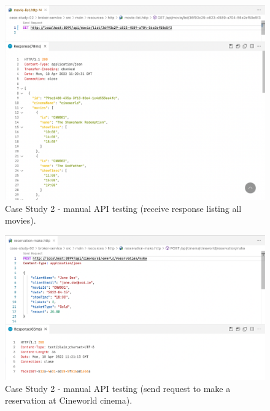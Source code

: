 \begin{figure}[H]
  \centering
  \includegraphics[width=1.0\linewidth]{./assets/images/case-studies/cs02-manual-2.png}
  \caption{Case Study 2 - manual API testing (receive response listing all movies).}
  \label{fig:cs02-manual-2}
\end{figure}

\begin{figure}[H]
  \centering
  \includegraphics[width=1.0\linewidth]{./assets/images/case-studies/cs02-manual-3.png}
  \caption{Case Study 2 - manual API testing (send request to make a reservation at Cineworld cinema).}
  \label{fig:cs02-manual-3}
\end{figure}

